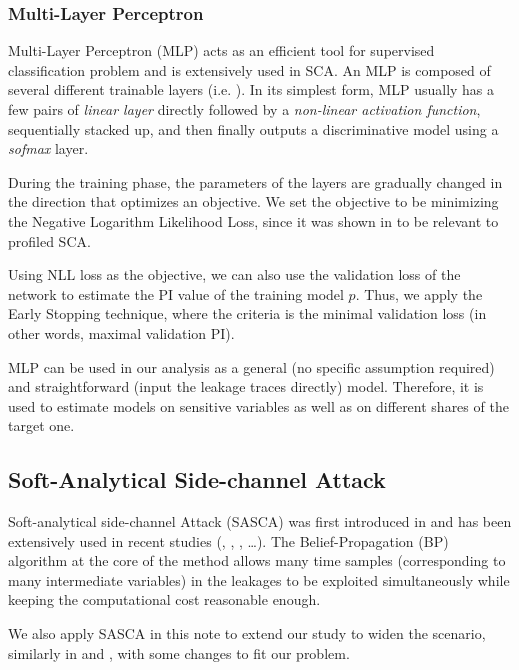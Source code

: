 \documentclass{llncs}
\begin{document}
	\subsubsection*{Multi-Layer Perceptron} 
	Multi-Layer Perceptron (MLP) acts as an efficient tool for supervised classification problem  and is extensively used in SCA. An MLP is composed of several different  trainable layers (i.e. ). In its simplest form, MLP usually has a few pairs of \textit{linear layer} directly followed by a \textit{non-linear activation function}, sequentially stacked up, and then finally outputs a discriminative model using a \textit{sofmax} layer. 
	
	During the training phase, the parameters of the layers are gradually changed in the direction that optimizes an objective. We set the objective to be minimizing the Negative Logarithm Likelihood Loss, since it was shown in \cite{DNN} to be relevant to profiled SCA.
	
	Using NLL loss as the objective, we can also use the validation loss of the network to estimate the PI value of the training model $p$. Thus, we apply the Early Stopping technique, where the criteria is the minimal validation loss (in other words, maximal validation PI). 
	
	MLP can be used in our analysis as a general (no specific assumption required) and straightforward (input the leakage traces directly) model. Therefore, it is used to estimate models on sensitive variables as well as on different shares of the target one.
	\subsection*{Soft-Analytical Side-channel Attack}
	Soft-analytical side-channel Attack (SASCA) was first introduced in \cite{sasca} and has been extensively used in recent studies (\cite{lcert}, \cite{mshares}, \cite{primemask}, \dots). The Belief-Propagation (BP) algorithm at the core of the method allows many time samples (corresponding to many intermediate variables) in the leakages to be exploited simultaneously while keeping the computational cost reasonable enough. 
	
	We also apply SASCA in this note to extend our study to widen the scenario, similarly in \cite{primemask} and \cite{mshares}, with some changes to fit our problem.
	
\end{document}
